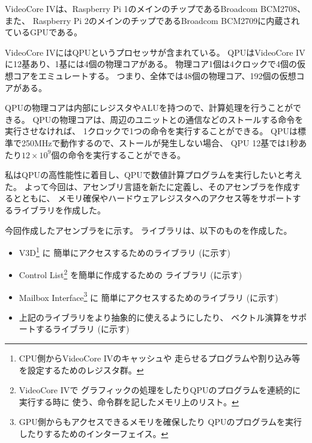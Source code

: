 \def \wrkdir {p.vc4/}

\label{pa:vc4}

VideoCore IVは、Raspberry Pi 1のメインのチップであるBroadcom BCM2708、また、
Raspberry Pi 2のメインのチップであるBroadcom BCM2709に内蔵されているGPUである。

VideoCore IVにはQPUというプロセッサが含まれている。
QPUはVideoCore IVに12基あり、1基には4個の物理コアがある。
物理コア1個は4クロックで4個の仮想コアをエミュレートする。
つまり、全体では48個の物理コア、192個の仮想コアがある。

QPUの物理コアは内部にレジスタやALUを持つので、計算処理を行うことができる。
QPUの物理コアは、周辺のユニットとの通信などのストールする命令を実行させなければ、
1クロックで1つの命令を実行することができる。
QPUは標準で250MHzで動作するので、ストールが発生しない場合、
QPU 12基では1秒あたり$12 \times 10^9$個の命令を実行することができる。

私はQPUの高性能性に着目し、QPUで数値計算プログラムを実行したいと考えた。
よって今回は、アセンブリ言語を新たに定義し、そのアセンブラを作成するとともに、
メモリ確保やハードウェアレジスタへのアクセス等をサポートするライブラリを作成した。

今回作成したアセンブラを\cite{bib:qtc}に示す。
ライブラリは、以下のものを作成した。
\begin{itemize}
\item V3D\footnote{CPU側からVideoCore IVのキャッシュや
	走らせるプログラムや割り込み等を設定するためのレジスタ群。} に
	簡単にアクセスするためのライブラリ (\cite{bib:libvc4v3d}に示す)
\item Control List\footnote{VideoCore IVで
	グラフィックの処理をしたりQPUのプログラムを連続的に実行する時に
	使う、命令群を記したメモリ上のリスト。} を簡単に作成するための
	ライブラリ (\cite{bib:libvc4clist}に示す)
\item Mailbox Interface\footnote{GPU側からもアクセスできるメモリを確保したり
	QPUのプログラムを実行したりするためのインターフェイス。} に
	簡単にアクセスするためのライブラリ (\cite{bib:mailbox}に示す)
\item 上記のライブラリをより抽象的に使えるようにしたり、
	ベクトル演算をサポートするライブラリ (\cite{bib:libvc4vec}に示す)
\end{itemize}
